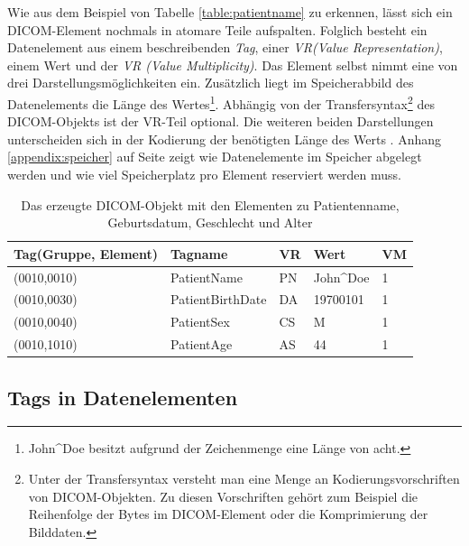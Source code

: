 Wie aus dem Beispiel von Tabelle \ref{table:patientname} zu erkennen, lässt sich ein DICOM-Element nochmals in atomare Teile aufspalten. Folglich besteht ein Datenelement aus einem beschreibenden \textit{Tag}, einer \textit{VR(Value Representation)}, einem Wert und der \textit{VR (Value Multiplicity)}. Das Element selbst nimmt eine von drei Darstellungsmöglichkeiten ein. Zusätzlich liegt im Speicherabbild des Datenelements die Länge des Wertes\footnote{John\^{}Doe besitzt aufgrund der Zeichenmenge eine Länge von acht.}. Abhängig von der Transfersyntax\footnote{Unter der Transfersyntax versteht man eine Menge an Kodierungsvorschriften von DICOM-Objekten\cite[S.63 Section 10]{dicom:structure}. Zu diesen Vorschriften gehört zum Beispiel die Reihenfolge der Bytes im DICOM-Element oder die Komprimierung der Bilddaten.} des DICOM-Objekts ist der VR-Teil optional. Die weiteren beiden Darstellungen unterscheiden sich in der Kodierung der benötigten Länge des Werts \cite[7.1]{dicom:structure}.  Anhang \ref{appendix:speicher} auf Seite \pageref{appendix:speicher} zeigt wie Datenelemente im Speicher abgelegt werden und wie viel Speicherplatz pro Element reserviert werden muss.

\begin{table}
    \begin{tabularx}{\textwidth}{|p{4cm}|p{4cm}|X|X|X|}
    \toprule
    \hline
    \textbf{Tag\newline \small{(Gruppe, Element)}}         & \textbf{Tagname}     & \textbf{VR} & \textbf{Wert}     	& \textbf{VM} \\ \hline
    (0010,0010) 		 & PatientName 			& PN 		  & John\^{}Doe 		& 1  \\ \hline
    (0010,0030) 		 & PatientBirthDate		& DA 		  & 19700101	 		& 1  \\ \hline
    (0010,0040)			 & PatientSex 			& CS 		  & M			 		& 1  \\ \hline
    (0010,1010) 		 & PatientAge 			& AS 		  & 44			 		& 1  \\ \hline
    \bottomrule
    \end{tabularx}
    \caption {Das erzeugte DICOM-Objekt mit den Elementen zu Patientenname, Geburtsdatum, Geschlecht und Alter}
    \label{table:translation}
\end{table}

\subsection{Tags in Datenelementen}

